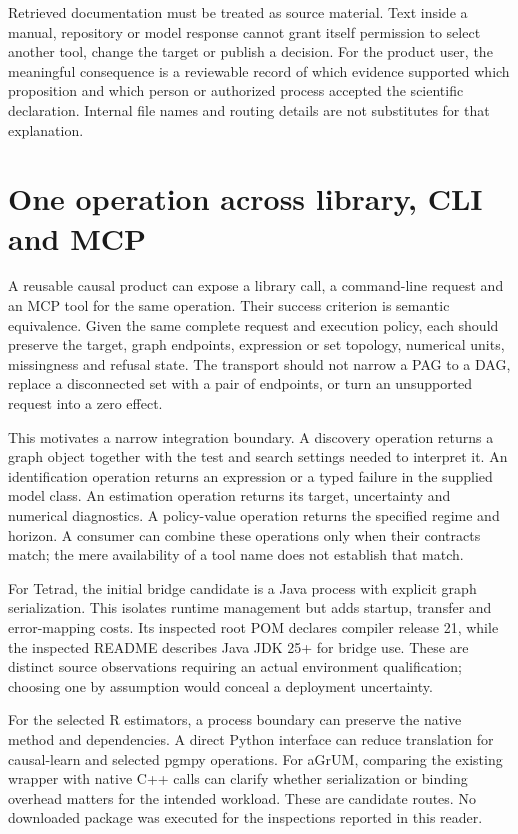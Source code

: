 Retrieved documentation must be treated as source material. Text inside a
manual, repository or model response cannot grant itself permission to select
another tool, change the target or publish a decision. For the product user,
the meaningful consequence is a reviewable record of which evidence supported
which proposition and which person or authorized process accepted the
scientific declaration. Internal file names and routing details are not
substitutes for that explanation.

\section{One operation across library, CLI and MCP}

A reusable causal product can expose a library call, a command-line request
and an MCP tool for the same operation. Their success criterion is semantic
equivalence. Given the same complete request and execution policy, each should
preserve the target, graph endpoints, expression or set topology, numerical
units, missingness and refusal state. The transport should not narrow a PAG
to a DAG, replace a disconnected set with a pair of endpoints, or turn an
unsupported request into a zero effect.

This motivates a narrow integration boundary. A discovery operation returns
a graph object together with the test and search settings needed to interpret
it. An identification operation returns an expression or a typed failure in
the supplied model class. An estimation operation returns its target,
uncertainty and numerical diagnostics. A policy-value operation returns the
specified regime and horizon. A consumer can combine these operations only
when their contracts match; the mere availability of a tool name does not
establish that match.

For Tetrad, the initial bridge candidate is a Java process with explicit graph
serialization. This isolates runtime management but adds startup, transfer
and error-mapping costs. Its inspected root POM declares compiler release 21,
while the inspected README describes Java JDK 25+ for bridge use. These are
distinct source observations requiring an actual environment qualification;
choosing one by assumption would conceal a deployment uncertainty.
\citep{v12_sw_tetrad}

For the selected R estimators, a process boundary can preserve the native
method and dependencies. A direct Python interface can reduce translation
for causal-learn and selected pgmpy operations. For aGrUM, comparing the
existing wrapper with native C++ calls can clarify whether serialization or
binding overhead matters for the intended workload. These are candidate
routes. No downloaded package was executed for the inspections reported in
this reader.

